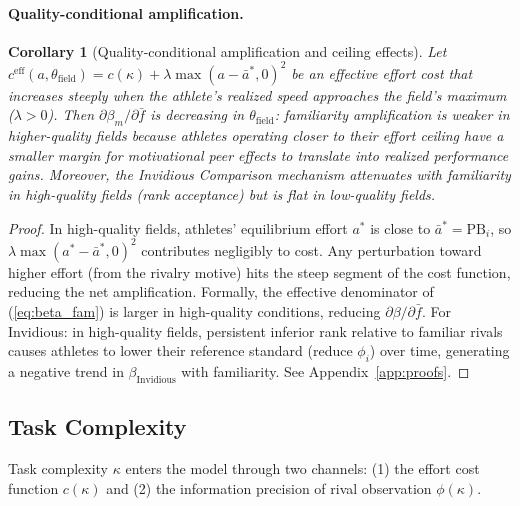 \documentclass[12pt]{article}
\newtheorem{corollary}{Corollary}
\theoremstyle{definition}
\theoremstyle{remark}
\begin{document}
\paragraph{Quality-conditional amplification.}
\begin{corollary}[Quality-conditional amplification and ceiling effects]
\label{cor:quality}
Let $c^{\text{eff}}(a, \theta_{\text{field}}) = c(\kappa) + \lambda \max(a - \bar{a}^*, 0)^2$
be an effective effort cost that increases steeply when the athlete's realized speed
approaches the field's maximum ($\lambda > 0$).
Then $\partial \beta_m/\partial \bar{f}$ is decreasing in $\theta_{\text{field}}$:
familiarity amplification is weaker in higher-quality fields
because athletes operating closer to their effort ceiling have a smaller
margin for motivational peer effects to translate into realized performance gains.
Moreover, the Invidious Comparison mechanism attenuates with familiarity in
high-quality fields (rank acceptance) but is flat in low-quality fields.
\end{corollary}

\begin{proof}
In high-quality fields, athletes' equilibrium effort $a^*$ is close to
$\bar{a}^* = \text{PB}_i$, so $\lambda \max(a^* - \bar{a}^*,0)^2$ contributes
negligibly to cost.
Any perturbation toward higher effort (from the rivalry motive) hits the steep
segment of the cost function, reducing the net amplification.
Formally, the effective denominator of (\ref{eq:beta_fam}) is larger in
high-quality conditions, reducing $\partial\beta/\partial\bar{f}$.
For Invidious: in high-quality fields, persistent inferior rank relative to
familiar rivals causes athletes to lower their reference standard (reduce $\phi_i$)
over time, generating a negative trend in $\beta_{\text{Invidious}}$ with
familiarity.
See Appendix~\ref{app:proofs}.
\end{proof}

\subsection{Task Complexity}
\label{subsec:complexity}

Task complexity $\kappa$ enters the model through two channels:
(1) the effort cost function $c(\kappa)$ and
(2) the information precision of rival observation $\phi(\kappa)$.
\end{document}
